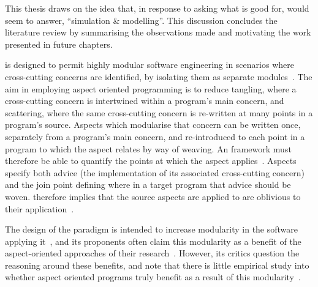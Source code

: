 This thesis draws on the idea that, in response to
  \citeauthor{steimann06paradoxical} asking what \aspectorientation{} is good for,
\citeauthor{gulyas1999use} would seem to answer, ``simulation \&
  modelling''. This discussion concludes the literature review by summarising
  the observations made and motivating the work presented in future chapters.


\Aop{} is designed to permit highly modular software
engineering in scenarios where cross-cutting concerns are identified, by
isolating them as separate modules~\cite{kiczales1997aspect}. The aim in
employing aspect oriented programming is to reduce tangling, where a
cross-cutting concern is intertwined within a program's main concern, and
scattering, where the same cross-cutting concern is re-written at many points in
a program's source. Aspects which modularise that concern can be written once,
separately from a program's main concern, and re-introduced to each point in a
program to which the aspect relates by way of weaving. An \aspectorientation{}
framework must therefore be able to quantify the points at which the aspect
applies~\cite{filman2000aspect}. Aspects specify both advice (the implementation
of its associated cross-cutting concern) and the join point defining where in a
target program that advice should be woven. \Aspectorientation{} therefore implies
that the source aspects are applied to are oblivious to their
application~\cite{filman2000aspect}.

The design of the paradigm is intended to increase modularity in the software
applying it~\cite{kiczales1997aspect,filman2000aspect,przybylek2018empirical},
and its proponents often claim this modularity as a benefit of the
aspect-oriented approaches of their
research~\cite{gilani2004family,charfi2007ao4bpel,Cappelli_AOBPM,jalali2012aspect,chibani2013toward}.
However, its critics question the reasoning around these benefits, and note that
there is little empirical study into whether aspect oriented programs truly
benefit as a result of this
modularity~\cite{Constantinides04aopconsidered,steimann06paradoxical,przybylek2010wrong,przybylek2018empirical}.

